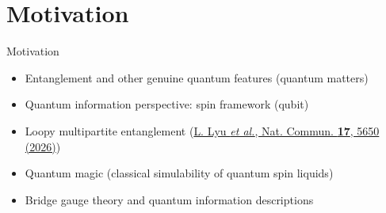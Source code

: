 \documentclass[professionalfont,
                xcolor=dvipsnames]{beamer}
\newcommand{\scite}[2]{\href{ #1 }{{\tiny #2}}} %
\begin{document}
\section{Motivation}
\begin{frame}{Motivation}
    \begin{itemize}
        \item Entanglement and other genuine quantum features (quantum matters)
        \item Quantum information perspective: spin framework (qubit)
        \item Loopy multipartite entanglement 
            (\scite{https://www.nature.com/articles/s41467-026-71113-8}{L. Lyu \textit{et al.}, Nat. Commun. \textbf{17}, 5650 (2026)})
        \item Quantum magic (classical simulability of quantum spin liquids)
        \item Bridge gauge theory and quantum information descriptions
    \end{itemize}
\end{frame}
    
                
        
\end{document}
